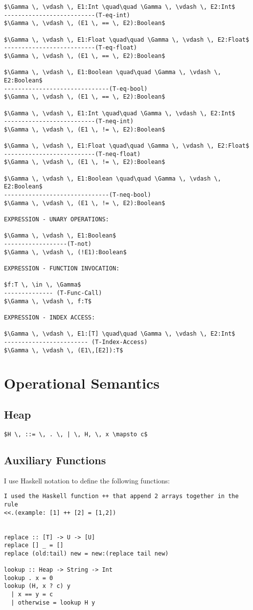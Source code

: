 \documentclass[11pt, a4paper]{article}
\begin{document}
\begin{lstlisting}
$\Gamma \, \vdash \, E1:Int \quad\quad \Gamma \, \vdash \, E2:Int$
--------------------------(T-eq-int)
$\Gamma \, \vdash \, (E1 \, == \, E2):Boolean$

$\Gamma \, \vdash \, E1:Float \quad\quad \Gamma \, \vdash \, E2:Float$
--------------------------(T-eq-float)
$\Gamma \, \vdash \, (E1 \, == \, E2):Boolean$

$\Gamma \, \vdash \, E1:Boolean \quad\quad \Gamma \, \vdash \, E2:Boolean$
------------------------------(T-eq-bool)
$\Gamma \, \vdash \, (E1 \, == \, E2):Boolean$

$\Gamma \, \vdash \, E1:Int \quad\quad \Gamma \, \vdash \, E2:Int$
--------------------------(T-neq-int)
$\Gamma \, \vdash \, (E1 \, != \, E2):Boolean$

$\Gamma \, \vdash \, E1:Float \quad\quad \Gamma \, \vdash \, E2:Float$
--------------------------(T-neq-float)
$\Gamma \, \vdash \, (E1 \, != \, E2):Boolean$

$\Gamma \, \vdash \, E1:Boolean \quad\quad \Gamma \, \vdash \, E2:Boolean$
------------------------------(T-neq-bool)
$\Gamma \, \vdash \, (E1 \, != \, E2):Boolean$

EXPRESSION - UNARY OPERATIONS:

$\Gamma \, \vdash \, E1:Boolean$
------------------(T-not)
$\Gamma \, \vdash \, (!E1):Boolean$

EXPRESSION - FUNCTION INVOCATION:

$f:T \, \in \, \Gamma$
-------------- (T-Func-Call)
$\Gamma \, \vdash \, f:T$

EXPRESSION - INDEX ACCESS:

$\Gamma \, \vdash \, E1:[T] \quad\quad \Gamma \, \vdash \, E2:Int$
------------------------ (T-Index-Access)
$\Gamma \, \vdash \, (E1\,[E2]):T$
\end{lstlisting}
\section{Operational Semantics}
\subsection*{Heap}
\begin{lstlisting}
$H \, ::= \, . \, | \, H, \, x \mapsto c$
\end{lstlisting}
\subsection*{Auxiliary Functions}
I use Haskell notation to define the following functions:
\begin{lstlisting}
I used the Haskell function ++ that append 2 arrays together in the rule
<<.(example: [1] ++ [2] = [1,2]) 


replace :: [T] -> U -> [U]
replace [] _ = []
replace (old:tail) new = new:(replace tail new)

lookup :: Heap -> String -> Int
lookup . x = 0
lookup (H, x ? c) y
  | x == y = c
  | otherwise = lookup H y
\end{lstlisting}
\end{document}
